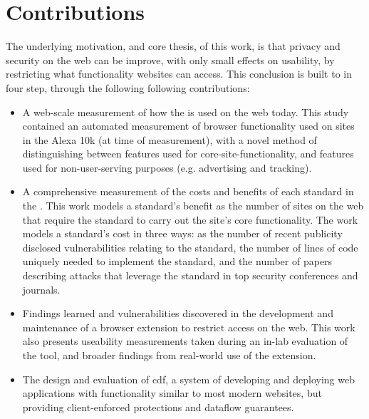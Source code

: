 \section{Contributions}
\label{intro:contributions}

The underlying motivation, and core thesis, of this work, is that privacy
and security on the web can be improve, with only small effects on usability,
by restricting what functionality websites can access.  This conclusion
is built to in four step, through the following following contributions:

\begin{itemize}
    \item A web-scale measurement of how the \WAPI is used on the web today.
          This study contained an automated measurement of browser functionality
          used on sites in the Alexa 10k (at time of measurement), with
          a novel method of distinguishing between features used
          for core-site-functionality, and features used for
          non-user-serving purposes (e.g. advertising and tracking).
    \item A comprehensive measurement of the costs and benefits of each standard
          in the \WAPI.  This work models a standard's
          benefit as the number of sites on the web that require the standard
          to carry out the site's core functionality.  The work models
          a standard's cost in three ways: as the number of recent publicity
          disclosed vulnerabilities relating to the standard, the number
          of lines of code uniquely needed to implement the standard, and
          the number of papers describing attacks that leverage the standard
          in top security conferences and journals.
    \item Findings learned and vulnerabilities discovered in the development
          and maintenance of a browser extension to restrict \WAPI access on
          the web.  This work also presents useability
          measurements taken during an in-lab evaluation of the tool, and
          broader findings from real-world use of the extension.
    \item The design and evaluation of \gls{cdf}, a system of developing and deploying
          web applications with functionality similar to most modern websites,
          but providing client-enforced protections and dataflow
          guarantees.
\end{itemize}

